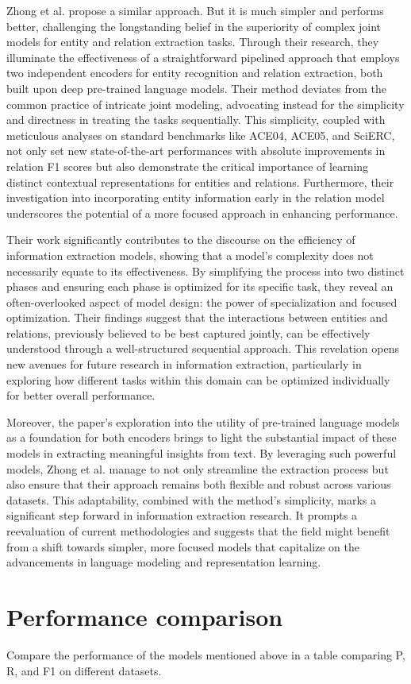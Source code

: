 Zhong et al. \cite{Zhong2020AFE} propose a similar approach. But it is much simpler and performs better, challenging the longstanding belief in the superiority of complex joint models for entity and relation extraction tasks. Through their research, they illuminate the effectiveness of a straightforward pipelined approach that employs two independent encoders for entity recognition and relation extraction, both built upon deep pre-trained language models. Their method deviates from the common practice of intricate joint modeling, advocating instead for the simplicity and directness in treating the tasks sequentially. This simplicity, coupled with meticulous analyses on standard benchmarks like ACE04, ACE05, and SciERC, not only set new state-of-the-art performances with absolute improvements in relation F1 scores but also demonstrate the critical importance of learning distinct contextual representations for entities and relations. Furthermore, their investigation into incorporating entity information early in the relation model underscores the potential of a more focused approach in enhancing performance.

Their work significantly contributes to the discourse on the efficiency of information extraction models, showing that a model's complexity does not necessarily equate to its effectiveness. By simplifying the process into two distinct phases and ensuring each phase is optimized for its specific task, they reveal an often-overlooked aspect of model design: the power of specialization and focused optimization. Their findings suggest that the interactions between entities and relations, previously believed to be best captured jointly, can be effectively understood through a well-structured sequential approach. This revelation opens new avenues for future research in information extraction, particularly in exploring how different tasks within this domain can be optimized individually for better overall performance.

Moreover, the paper's exploration into the utility of pre-trained language models as a foundation for both encoders brings to light the substantial impact of these models in extracting meaningful insights from text. By leveraging such powerful models, Zhong et al. manage to not only streamline the extraction process but also ensure that their approach remains both flexible and robust across various datasets. This adaptability, combined with the method's simplicity, marks a significant step forward in information extraction research. It prompts a reevaluation of current methodologies and suggests that the field might benefit from a shift towards simpler, more focused models that capitalize on the advancements in language modeling and representation learning.

\section{Performance comparison}
Compare the performance of the models mentioned above in a table comparing P, R, and F1 on different datasets.



